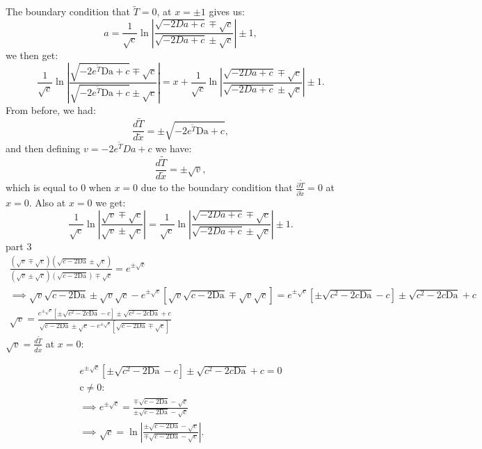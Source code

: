 \documentclass[12pt]{article}
\newcommand{\twoeda}{-2e^{\tilde{T}}\text{Da}}
\newcommand{\da}{\text{Da}}
\begin{document}
The boundary condition that $\tilde{T} = 0$, at $x = \pm 1$ gives us:
\begin{equation}
    a = \frac{1}{\sqrt{c}}\ln\left|\frac{\sqrt{-2Da + c} \mp \sqrt{c}}{\sqrt{-2Da + c} \pm \sqrt{c}} \right| \pm 1,
\end{equation}
we then get: 
\begin{equation}
    \frac{1}{\sqrt{c}}\ln\left|\frac{\sqrt{\twoeda + c} \mp \sqrt{c}}{\sqrt{\twoeda + c} \pm \sqrt{c}} \right| = x + \frac{1}{\sqrt{c}}\ln\left|\frac{\sqrt{-2Da + c} \mp \sqrt{c}}{\sqrt{-2Da + c} \pm \sqrt{c}} \right| \pm 1.
\end{equation}
From before, we had:
\begin{equation}
    \frac{d\tilde{T}}{d\tilde{x}} = \pm \sqrt{\twoeda + c},
\end{equation}
and then defining $v = -2e^{\tilde{T}}Da +c$ we have:
\begin{equation}
    \frac{d\tilde{T}}{d\tilde{x}} = \pm \sqrt{v},
\end{equation}
which is equal to $0$ when $x = 0$ due to the boundary condition that $\frac{\partial\tilde{T}}{\partial \tilde{x}} = 0$ at $x = 0$. 
Also at $x = 0$ we get:
\begin{equation}
    \frac{1}{\sqrt{c}}\ln\left|\frac{\sqrt{v} \mp \sqrt{c}}{\sqrt{v} \pm \sqrt{c}} \right| = \frac{1}{\sqrt{c}}\ln\left|\frac{\sqrt{-2Da + c} \mp \sqrt{c}}{\sqrt{-2Da + c} \pm \sqrt{c}} \right| \pm 1.
\end{equation}
part 3
\begin{equation}
\begin{split}
\frac{(\sqrt{v}\mp \sqrt{c})(\sqrt{c - 2\da}\pm \sqrt{c})}{(\sqrt{v}\pm \sqrt{c})(\sqrt{c - 2\da}) \mp \sqrt{c}} = e^{\pm \sqrt{c}}\\
\implies
    \sqrt{v}\sqrt{c - 2\da}\pm\sqrt{v}\sqrt{c}-e^{\pm\sqrt{c}}[\sqrt{v}\sqrt{c - 2\da} \mp \sqrt{v}\sqrt{c}] = e^{\pm \sqrt{c}}\left[\pm \sqrt{c^2 - 2c \da} - c\right] \pm \sqrt{c^2 - 2c\da} + c
    \\ \sqrt{v} = \frac{e^{\pm \sqrt{c}}\left[\pm \sqrt{c^2 - 2c \da} - c\right] \pm \sqrt{c^2 - 2c\da} + c}{\sqrt{c - 2\da}\pm\sqrt{c}-e^{\pm\sqrt{c}}[\sqrt{c - 2\da} \mp \sqrt{c}]}
\end{split}
\end{equation}
$\sqrt{v} = \frac{d\tilde{T}}{d\tilde{x}}$ at $x = 0$:

\begin{equation}
    \begin{split}
        e^{\pm \sqrt{c}}\left[\pm\sqrt{c^2 - 2\da} - c\right] \pm \sqrt{c^2 - 2c\da} + c = 0
        \\ \text{c}\neq 0:
        \\ \implies e^{\pm\sqrt{c}} = \frac{\mp \sqrt{c - 2\da} - \sqrt{c}}{\pm \sqrt{c - 2\da} - \sqrt{c}}
        \\ \implies \sqrt{c} = \ln\left| \frac{\pm \sqrt{c - 2\da} - \sqrt{c}}{\mp \sqrt{c - 2\da} - \sqrt{c}}\right|.
    \end{split}
\end{equation}
\end{document}
